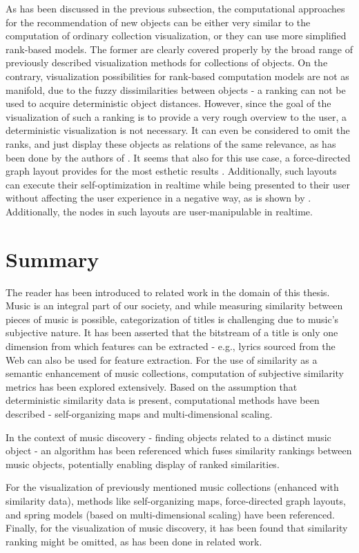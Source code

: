 As has been discussed in the previous subsection, the computational approaches for the recommendation of new objects can be either very similar to the computation of ordinary collection visualization, or they can use more simplified rank-based models. The former are clearly covered properly by the broad range of previously described visualization methods for collections of objects.
On the contrary, visualization possibilities for rank-based computation models are not as manifold, due to the fuzzy dissimilarities between objects - a ranking can not be used to acquire deterministic object distances. However, since the goal of the visualization of such a ranking is to provide a very rough overview to the user, a deterministic visualization is not necessary. It can even be considered to omit the ranks, and just display these objects as relations of the same relevance, as has been done by the authors of \cite{DBLP:conf/webist/SarmentoGCO09}. It seems that also for this use case, a force-directed graph layout provides for the most esthetic results \cite{DBLP:journals/spe/FruchtermanR91}. Additionally, such layouts can execute their self-optimization in realtime while being presented to their user without affecting the user experience in a negative way, as is shown by \cite{url:tuneglue}. Additionally, the nodes in such layouts are user-manipulable in realtime.

\section{Summary}

The reader has been introduced to related work in the domain of this thesis. Music is an integral part of our society, and while measuring similarity between pieces of music is possible, categorization of titles is challenging due to music's subjective nature. It has been asserted that the bitstream of a title is only one dimension from which features can be extracted - e.g., lyrics sourced from the Web can also be used for feature extraction. For the use of similarity as a semantic enhancement of music collections, computation of subjective similarity metrics has been explored extensively. Based on the assumption that deterministic similarity data is present, computational methods have been described - self-organizing maps and multi-dimensional scaling. 

In the context of music discovery - finding objects related to a distinct music object - an algorithm has been referenced which fuses similarity rankings between music objects, potentially enabling display of ranked similarities.

For the visualization of previously mentioned music collections (enhanced with similarity data), methods like self-organizing maps, force-directed graph layouts, and spring models (based on multi-dimensional scaling) have been referenced. Finally, for the visualization of music discovery, it has been found that similarity ranking might be omitted, as has been done in related work.